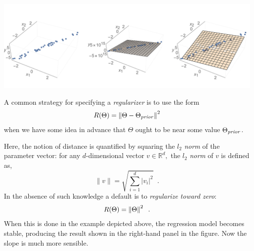 \includegraphics[width=1.12\textwidth]{figures/regression_ex2_plane1.png}

%
%
%

A common strategy for specifying a \emph{regularizer} is to use the form
\[ R(\Theta) = \left\lVert\Theta - \Theta_{\it prior}\right\rVert^2 \]
when we have some idea in advance that $\Theta$ ought to be near some
value $\Theta_{\it prior}$.

Here, the notion of distance is quantified by squaring the $l_2$ \textit{norm} of
the parameter vector: for any $d$-dimensional vector $v \in \mathbb{R}^d,$ the $l_2$ \textit{norm} of $v$ is defined as,
\[\|v\| = \sqrt{\sum_{i=1}^d |v_i|^2}\;\;. \]
In the absence of such knowledge a default is
to {\em regularize toward zero}:
\[ R(\Theta) = \left\lVert\Theta\right\rVert^2\;\;. \]
%
When this is done in the example depicted above, the regression model
becomes stable, producing the result shown in the right-hand panel in
the figure.  Now the slope is much more sensible.


